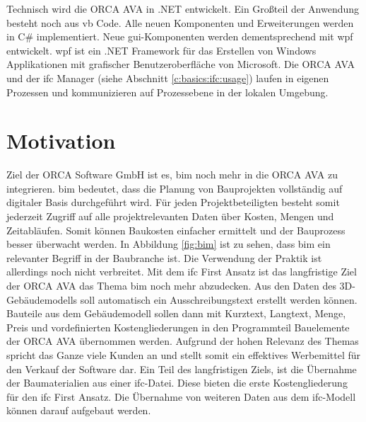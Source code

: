 Technisch wird die ORCA AVA in .NET entwickelt. Ein Großteil der Anwendung besteht noch aus \ac{vb} Code. Alle neuen Komponenten und Erweiterungen werden in C\# implementiert. Neue \ac{gui}-Komponenten werden dementsprechend mit \ac{wpf} entwickelt. \ac{wpf} ist ein .NET Framework für das Erstellen von Windows Applikationen mit grafischer Benutzeroberfläche von Microsoft. \citep{Microsoft_2022} Die ORCA AVA und der \ac{ifc} Manager (siehe Abschnitt \ref{c:basics:ifc:usage}) laufen in eigenen Prozessen und kommunizieren auf Prozessebene in der lokalen Umgebung. 

\section{Motivation}
\label{c:intro:motivation}

Ziel der \glqq ORCA Software GmbH\grqq{} ist es, \ac{bim} noch mehr in die ORCA AVA zu integrieren. \ac{bim} bedeutet, dass die Planung von Bauprojekten vollständig auf digitaler Basis durchgeführt wird.  Für jeden Projektbeteiligten besteht somit jederzeit Zugriff auf alle projektrelevanten Daten über Kosten, Mengen und Zeitabläufen. Somit können Baukosten einfacher ermittelt und der Bauprozess besser überwacht werden. In Abbildung \ref{fig:bim} ist zu sehen, dass \ac{bim} ein relevanter Begriff in der Baubranche ist. Die Verwendung der Praktik ist allerdings noch nicht verbreitet. \citep[p.~20]{Thomas_Baumanns_Dr_Philipp-Stephan_Freber_Dr_Kai-Stefan_Schober_Dr_Florian_Kirchner2016-gu} Mit dem \glqq \ac{ifc} First\grqq{} Ansatz ist das langfristige Ziel der ORCA AVA das Thema \ac{bim} noch mehr abzudecken. Aus den Daten des 3D-Gebäudemodells soll automatisch ein Ausschreibungstext erstellt werden können. Bauteile aus dem Gebäudemodell sollen dann mit Kurztext, Langtext, Menge, Preis und vordefinierten Kostengliederungen in den Programmteil Bauelemente der ORCA AVA übernommen werden. Aufgrund der hohen Relevanz des Themas spricht das Ganze viele Kunden an und stellt somit ein effektives Werbemittel für den Verkauf der Software dar. Ein Teil des langfristigen Ziels, ist die Übernahme der Baumaterialien aus einer \ac{ifc}-Datei. Diese bieten die erste Kostengliederung für den \glqq \ac{ifc} First\grqq{} Ansatz. Die Übernahme von weiteren Daten aus dem \ac{ifc}-Modell können darauf aufgebaut werden.

